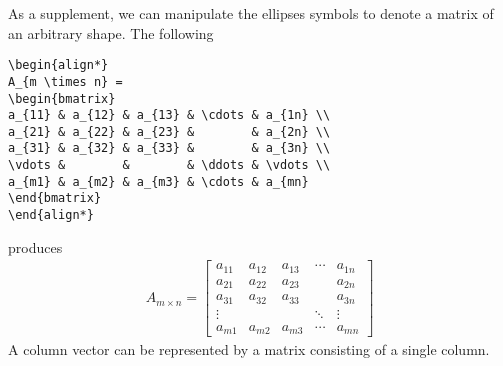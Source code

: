 As a supplement, we can manipulate the ellipses symbols to denote a matrix of an arbitrary shape. The following
\begin{lstlisting}
\begin{align*}
A_{m \times n} = 
\begin{bmatrix}
a_{11} & a_{12} & a_{13} & \cdots & a_{1n} \\
a_{21} & a_{22} & a_{23} &        & a_{2n} \\
a_{31} & a_{32} & a_{33} &        & a_{3n} \\
\vdots &        &        & \ddots & \vdots \\
a_{m1} & a_{m2} & a_{m3} & \cdots & a_{mn}
\end{bmatrix}
\end{align*}
\end{lstlisting}
produces
\begin{align*}
A_{m \times n} = 
\begin{bmatrix}
a_{11} & a_{12} & a_{13} & \cdots & a_{1n} \\
a_{21} & a_{22} & a_{23} &        & a_{2n} \\
a_{31} & a_{32} & a_{33} &        & a_{3n} \\
\vdots &        &        & \ddots & \vdots \\
a_{m1} & a_{m2} & a_{m3} & \cdots & a_{mn}
\end{bmatrix}
\end{align*}
A column vector can be represented by a matrix consisting of a single column.

